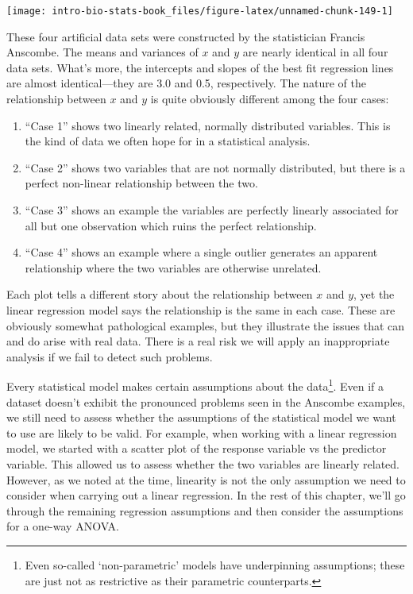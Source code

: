 \documentclass[
]{book}
\begin{document}
\begin{center}\texttt{[image: intro-bio-stats-book\_files/figure-latex/unnamed-chunk-149-1]} \end{center}

These four artificial data sets were constructed by the statistician Francis Anscombe. The means and variances of \(x\) and \(y\) are nearly identical in all four data sets. What's more, the intercepts and slopes of the best fit regression lines are almost identical---they are 3.0 and 0.5, respectively. The nature of the relationship between \(x\) and \(y\) is quite obviously different among the four cases:

\begin{enumerate}
\def\labelenumi{\arabic{enumi}.}
\item
  ``Case 1'' shows two linearly related, normally distributed variables. This is the kind of data we often hope for in a statistical analysis.
\item
  ``Case 2'' shows two variables that are not normally distributed, but there is a perfect non-linear relationship between the two.
\item
  ``Case 3'' shows an example the variables are perfectly linearly associated for all but one observation which ruins the perfect relationship.
\item
  ``Case 4'' shows an example where a single outlier generates an apparent relationship where the two variables are otherwise unrelated.
\end{enumerate}

Each plot tells a different story about the relationship between \(x\) and \(y\), yet the linear regression model says the relationship is the same in each case. These are obviously somewhat pathological examples, but they illustrate the issues that can and do arise with real data. There is a real risk we will apply an inappropriate analysis if we fail to detect such problems.

Every statistical model makes certain assumptions about the data\footnote{Even so-called `non-parametric' models have underpinning assumptions; these are just not as restrictive as their parametric counterparts.}. Even if a dataset doesn't exhibit the pronounced problems seen in the Anscombe examples, we still need to assess whether the assumptions of the statistical model we want to use are likely to be valid. For example, when working with a linear regression model, we started with a scatter plot of the response variable vs the predictor variable. This allowed us to assess whether the two variables are linearly related. However, as we noted at the time, linearity is not the only assumption we need to consider when carrying out a linear regression. In the rest of this chapter, we'll go through the remaining regression assumptions and then consider the assumptions for a one-way ANOVA.
\end{document}
